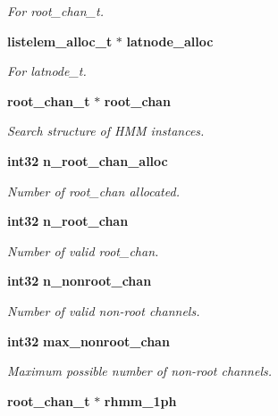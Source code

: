 \begin{DoxyCompactItemize}
\begin{DoxyCompactList}\small\item\em \-For root\-\_\-chan\-\_\-t. \end{DoxyCompactList}\item 
{\bf listelem\-\_\-alloc\-\_\-t} $\ast$ {\bf latnode\-\_\-alloc}\label{structngram__search__s_a21600dc2e23744f0be9c64a4db8d7e50}

\begin{DoxyCompactList}\small\item\em \-For latnode\-\_\-t. \end{DoxyCompactList}\item 
{\bf root\-\_\-chan\-\_\-t} $\ast$ {\bf root\-\_\-chan}
\begin{DoxyCompactList}\small\item\em \-Search structure of \-H\-M\-M instances. \end{DoxyCompactList}\item 
{\bf int32} {\bf n\-\_\-root\-\_\-chan\-\_\-alloc}\label{structngram__search__s_abc8a67e3f64adc470c78dfdd23be4126}

\begin{DoxyCompactList}\small\item\em \-Number of root\-\_\-chan allocated. \end{DoxyCompactList}\item 
{\bf int32} {\bf n\-\_\-root\-\_\-chan}\label{structngram__search__s_a297d8bdb856617490ee8ccd99df70e68}

\begin{DoxyCompactList}\small\item\em \-Number of valid root\-\_\-chan. \end{DoxyCompactList}\item 
{\bf int32} {\bf n\-\_\-nonroot\-\_\-chan}\label{structngram__search__s_a043723786367f5026dce99c261f7086d}

\begin{DoxyCompactList}\small\item\em \-Number of valid non-\/root channels. \end{DoxyCompactList}\item 
{\bf int32} {\bf max\-\_\-nonroot\-\_\-chan}\label{structngram__search__s_a4b2b42349e9e3df7e93b4a7d6994f63f}

\begin{DoxyCompactList}\small\item\em \-Maximum possible number of non-\/root channels. \end{DoxyCompactList}\item 
{\bf root\-\_\-chan\-\_\-t} $\ast$ {\bf rhmm\-\_\-1ph}\label{structngram__search__s_a1ffa3c9100252122ae8a2a713c50b527}


\end{DoxyCompactItemize}
